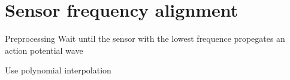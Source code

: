 \section{Sensor frequency alignment}
    \begin{frame}[allowframebreaks]{Preprocessing}
     Wait until the sensor with the lowest frequence propegates an action potential wave
     
    Use polynomial interpolation
    
    \end{frame}